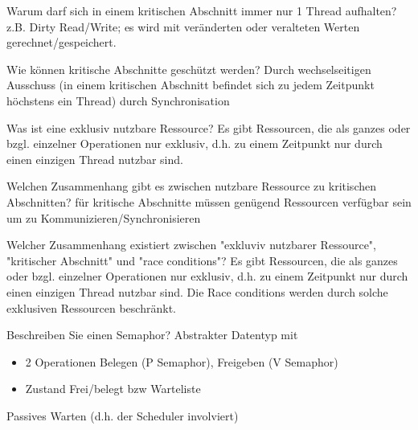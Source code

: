 \documentclass[avery5371]{flashcards}
\begin{document}
\begin{flashcard}{Warum darf sich in einem kritischen Abschnitt immer nur 1 Thread aufhalten?}
    z.B. Dirty Read/Write; es wird mit veränderten oder veralteten Werten gerechnet/gespeichert. 
\end{flashcard}

\begin{flashcard}{Wie können kritische Abschnitte geschützt werden?}
    Durch wechselseitigen Ausschuss (in einem kritischen Abschnitt befindet sich zu jedem Zeitpunkt höchstens ein Thread) durch Synchronisation
\end{flashcard}

\begin{flashcard}{Was ist eine exklusiv nutzbare Ressource?}
    Es gibt Ressourcen, die als ganzes oder bzgl. einzelner Operationen nur exklusiv, d.h. zu einem Zeitpunkt nur durch einen einzigen Thread nutzbar sind.
\end{flashcard}

\begin{flashcard}{Welchen Zusammenhang gibt es zwischen nutzbare Ressource zu kritischen Abschnitten?}
    für kritische Abschnitte müssen genügend Ressourcen verfügbar sein um zu Kommunizieren/Synchronisieren
\end{flashcard}

\begin{flashcard}{Welcher Zusammenhang existiert zwischen "exkluviv nutzbarer Ressource", "kritischer Abschnitt" und "race conditions"?}
    Es gibt Ressourcen, die als ganzes oder bzgl. einzelner Operationen nur exklusiv, d.h. zu einem Zeitpunkt nur durch einen einzigen Thread nutzbar sind. Die Race conditions werden durch solche exklusiven Ressourcen beschränkt.
\end{flashcard}

\begin{flashcard}[Semaphor]{Beschreiben Sie einen Semaphor?}
    Abstrakter Datentyp mit
    \begin{itemize}
        \item 2 Operationen Belegen (P Semaphor), Freigeben (V Semaphor)
        \item Zustand Frei/belegt bzw Warteliste
    \end{itemize}
    Passives Warten (d.h. der Scheduler involviert)
\end{flashcard}
\end{document}
